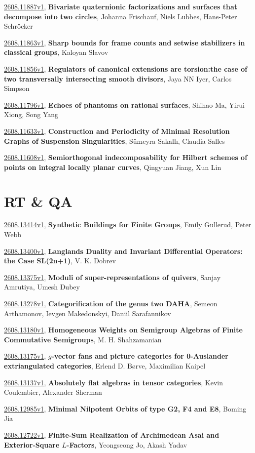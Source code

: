 \documentclass[9pt, a4paper]{article}
\theoremstyle{plain}
\theoremstyle{definition}
\theoremstyle{remark}
\newcommand{\arxiv}[3]{\href{https://arxiv.org/abs/#1}{#1}, \textbf{\textcolor{arxivblue}{#2}}, #3}
\begin{document}
\arxiv{2608.11887v1}{Bivariate quaternionic factorizations and surfaces that decompose into two circles}{Johanna Frischauf, Niels Lubbes, Hans-Peter Schröcker}

\arxiv{2608.11863v1}{Sharp bounds for frame counts and setwise stabilizers in classical groups}{Kaloyan Slavov}

\arxiv{2608.11856v1}{Regulators of canonical extensions are torsion:the case of two transversally intersecting smooth divisors}{Jaya NN Iyer, Carlos Simpson}

\arxiv{2608.11796v1}{Echoes of phantoms on rational surfaces}{Shihao Ma, Yirui Xiong, Song Yang}

\arxiv{2608.11633v1}{Construction and Periodicity of Minimal Resolution Graphs of Suspension Singularities}{Sümeyra Sakallı, Claudia Salles}

\arxiv{2608.11608v1}{Semiorthogonal indecomposability for Hilbert schemes of points on integral locally planar curves}{Qingyuan Jiang, Xun Lin}


\section{RT \& QA}
\arxiv{2608.13414v1}{Synthetic Buildings for Finite Groups}{Emily Gullerud, Peter Webb}

\arxiv{2608.13400v1}{Langlands Duality and Invariant Differential Operators: the Case SL(2n+1)}{V. K. Dobrev}

\arxiv{2608.13375v1}{Moduli of super-representations of quivers}{Sanjay Amrutiya, Umesh Dubey}

\arxiv{2608.13278v1}{Categorification of the genus two DAHA}{Semeon Arthamonov, Ievgen Makedonskyi, Daniil Sarafannikov}

\arxiv{2608.13180v1}{Homogeneous Weights on Semigroup Algebras of Finite Commutative Semigroups}{M. H. Shahzamanian}

\arxiv{2608.13175v1}{$g$-vector fans and picture categories for 0-Auslander extriangulated categories}{Erlend D. Børve, Maximilian Kaipel}

\arxiv{2608.13137v1}{Absolutely flat algebras in tensor categories}{Kevin Coulembier, Alexander Sherman}

\arxiv{2608.12985v1}{Minimal Nilpotent Orbits of type G2, F4 and E8}{Boming Jia}

\arxiv{2608.12722v1}{Finite-Sum Realization of Archimedean Asai and Exterior-Square $L$-Factors}{Yeongseong Jo, Akash Yadav}
\end{document}
